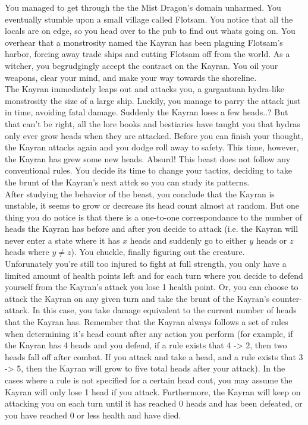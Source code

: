 
\noindent You managed to get through the the Mist Dragon's domain unharmed. You eventually stumble upon a small village
called Flotsam. You notice that all the locals are on edge, so you head over to the pub to find out whats going on. You overhear that
a monstrosity named the Kayran has been plaguing Flotsam's harbor, forcing away trade ships and cutting Flotsam off from the world.
As a witcher, you begrudgingly accept the contract on the Kayran. You oil your weapons, clear your mind, and make your way
towards the shoreline.\\

\noindent The Kayran immediately leaps out and attacks you, a gargantuan hydra-like monstrosity the size of a large ship. Luckily, you manage
to parry the attack just in time, avoiding fatal damage. Suddenly the Kayran loses a few heads..? But that can't be right,
all the lore books and bestiaries have taught you that hydras only ever grow heads when they are attacked. Before you can finish
your thought, the Kayran attacks again and you dodge roll away to safety. This time, however, the Kayran has grew some new heads.
Absurd! This beast does not follow any conventional rules. You decide its time to change your tactics, deciding to take the
brunt of the Kayran's next attck so you can study its patterns. \\

\noindent After studying the behavior of the beast, you conclude that the Kayran is unstable, it seems to grow or decrease its
head count almost at random. But one thing you do notice is that there is a one-to-one correspondance to the number of heads
the Kayran has before and after you decide to attack (i.e. the Kayran will never enter a state where it has $x$ heads and suddenly
go to either $y$ heads or $z$ heads where $y \neq z$). You chuckle, finally figuring out the creature.\\

\noindent Unforunately you're still too injured to fight at full strength, you only have a limited amount of health points left
and for each turn where you decide to defend yourself from the Kayran's attack you lose 1 health point. Or, you can choose to
attack the Kayran on any given turn and take the brunt of the Kayran's counter-attack. In this case, you take damage equivalent to the
current number of heads that the Kayran has. Remember that the Kayran always follows a set of rules when determining it's head
count after any action you perform (for example, if the Kayran has 4 heads and you defend, if a rule exists that 4 -> 2, then two heads
fall off after combat. If you attack and take a head, and a rule exists that 3 -> 5, then the Kayran will grow to five total heads
after your attack). In the cases where a rule is not specified for a certain head cout, you may assume the Kayran will only lose 1
head if you attack. Furthermore, the Kayran will keep on attacking you on each turn until it has reached 0 heads and has been defeated,
or you have reached 0 or less health and have died. \\

